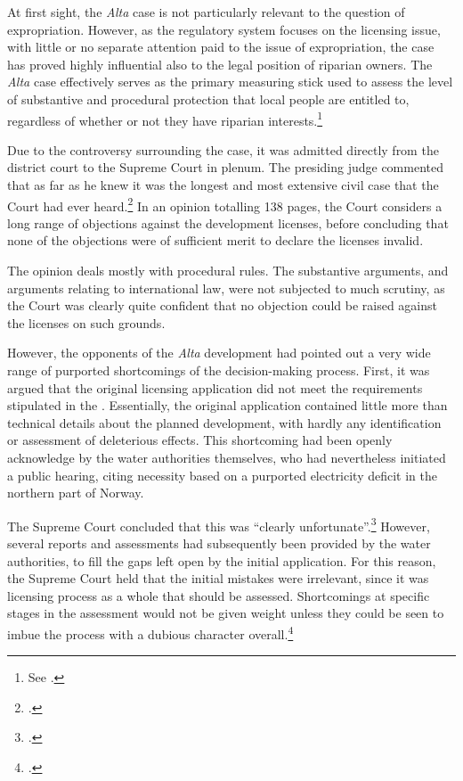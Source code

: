 At first sight, the {\it Alta} case is not particularly relevant to the question of expropriation. However, as the regulatory system focuses on the licensing issue, with little or no separate attention paid to the issue of expropriation, the case has proved highly influential also to the legal position of riparian owners. The {\it Alta} case effectively serves as the primary measuring stick used to assess the level of substantive and procedural protection that local people are entitled to, regardless of whether or not they have riparian interests.\footnote{See \cite{sauda09,jorpeland11}.}

Due to the controversy surrounding the case, it was admitted directly from the district court to the Supreme Court in plenum. The presiding judge commented that as far as he knew it was the longest and most extensive civil case that the Court had ever heard.\footcite[254]{alta82} In an opinion totalling 138 pages, the Court considers a long range of objections against the  development licenses, before concluding that none of the objections were of sufficient merit to declare the licenses invalid.

The opinion deals mostly with procedural rules. The substantive arguments, and arguments relating to international law, were not subjected to much scrutiny, as the Court was clearly quite confident that no objection could be raised against the licenses on such grounds.

However, the opponents of the {\it Alta} development had pointed out a very wide range of purported shortcomings of the decision-making process. First, it was argued that the original licensing application did not meet the requirements stipulated in the \cite[5]{wra17}. Essentially, the original application contained little more than technical details about the planned development, with hardly any identification or assessment of deleterious effects. This shortcoming had been openly acknowledge by the water authorities themselves, who had nevertheless initiated a public hearing, citing necessity based on a purported electricity deficit in the northern part of Norway. 

The Supreme Court concluded that this was ``clearly unfortunate''.\footcite[265]{alta82} However, several reports and assessments had subsequently been provided by the water authorities, to fill the gaps left open by the initial application. For this reason, the Supreme Court held that the initial mistakes were irrelevant, since it was licensing process as a whole that should be assessed. Shortcomings at specific stages in the assessment would not be given weight unless they could be seen to imbue the process with a dubious character overall.\footcite[265]{alta82}

